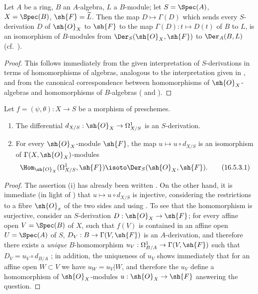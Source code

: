 \begin{proposition}[16.5.2]
\label{IV.16.5.2}
Let $A$ be a ring, $B$ an $A$-algebra, $L$ a $B$-module;
let $S = \Spec(A)$, $X=\Spec(B)$, $\sh{F} = \widetilde{L}$.
Then the map $D \mapsto \Gamma(D)$ which sends every $S$-derivation $D$ of $\sh{O}_X$ to $\sh{F}$ to the map $\Gamma(D) : t \mapsto D(t)$ of $B$ to $L$, is an isomorphism of $B$-modules from $\Der_S(\sh{O}_X, \sh{F})$ to $\Der_A(B, L)$ (cf.~).
\end{proposition}

\begin{proof}
This follows immediately from the given interpretation of $S$-derivations in terms
of homomorphisms of algebras, analogous to the interpretation given in , and from the canonical correspondence between homomorphisms of $\sh{O}_X$-algebras and homomorphisms of $B$-algebras ( and ).
\end{proof}

\begin{proposition}[16.5.3]
\label{IV.16.5.3}
Let $f = (\psi, \theta) : X \to S$ be a morphism of preschemes.
\begin{enumerate}
  \item[{\rm(i)}] The differential $d_{X/S} : \sh{O}_X \to \Omega_{X/S}^1$  is an $S$-derivation.
  \item[{\rm(ii)}] For every $\sh{O}_X$-module $\sh{F}$, the map $u \mapsto u \circ d_{X/S}$ is an isomorphism of $\Gamma(X, \sh{O}_X)$-modules
  \[
  \label{IV.16.5.3.1}
    \Hom_{\sh{O}_X}(\Omega_{X/S}^1, \sh{F}) \isoto \Der_S(\sh{O}_X, \sh{F}).
    \tag{16.5.3.1}
  \]
\end{enumerate}
\end{proposition}

\begin{proof}
The assertion (i) has already been written .
On the other hand, it is immediate (in light of ) that $u \mapsto u\circ d_{X/S}$ is injective, considering the restrictions to a fibre $\sh{O}_x$ of the two sides and using .
To see that the homomorphism  is surjective, consider an $S$-derivation $D : \sh{O}_X \to \sh{F}$;
for every affine open $V = \Spec(B)$ of $X$, such that $f(V)$ is contained in an affine open $U = \Spec(A)$ of $S$, $D_V : B \to \Gamma(V, \sh{F}) $ is an $A$-derivation, and therefore there exists a \emph{unique} $B$-homomorphism $u_V : \Omega_{B/A}^1 \to \Gamma(V, \sh{F})$ such that $D_V = u_V \circ d_{B/A}$ ;
in addition, the uniqueness of $u_V$ shows immediately that for an affine open $W \subset V$ we have $u_W = u_V|W$, and therefore the $u_V$ define a homomorphism of $\sh{O}_X$-modules $u : \sh{O}_X \to \sh{F}$ answering the question.
\end{proof}

